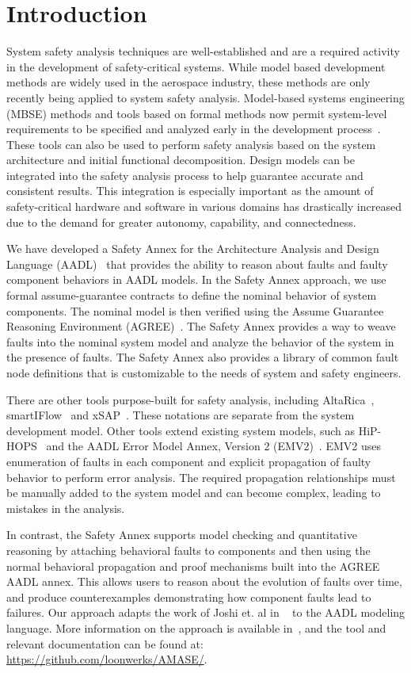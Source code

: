 \section{Introduction}
\label{sec:intro}
System safety analysis techniques are well-established and are a required activity in the development of safety-critical systems. While model based development methods are widely used in the aerospace industry, these methods are only recently being applied to system safety analysis. Model-based systems engineering (MBSE) methods and tools based on formal methods now permit system-level requirements to be specified and analyzed early in the development process~\cite{NFM2012:CoGaMiWhLaLu,CAV2015:BoCiGrMa}. These tools can also be used to perform safety analysis based on the system architecture and initial functional decomposition. Design models can be integrated into the safety analysis process to help guarantee accurate and consistent results. This integration is especially important as the amount of safety-critical hardware and software in various domains has drastically increased due to the demand for greater autonomy, capability, and connectedness.

We have developed a Safety Annex for the Architecture Analysis and Design Language (AADL)~\cite{FeilerModelBasedEngineering2012} that provides the ability to reason about faults and faulty component behaviors in AADL models. In the Safety Annex approach, we use formal assume-guarantee contracts to define the nominal behavior of system components. The nominal model is then verified using the Assume Guarantee Reasoning Environment (AGREE)~\cite{NFM2012:CoGaMiWhLaLu}. The Safety Annex  provides a way to weave faults into the nominal system model and analyze the behavior of the system in the presence of faults. The Safety Annex also provides a library of common fault node definitions that is customizable to the needs of system and safety engineers.

There are other tools purpose-built for safety analysis, including AltaRica~\cite{PROSVIRNOVA2013127}, smartIFlow~\cite{info8010007} and xSAP~\cite{DBLP:conf/tacas/BittnerBCCGGMMZ16}. These notations are separate from the system development model. Other tools extend existing system models, such as HiP-HOPS~\cite{CHEN201391} and the AADL Error Model Annex, Version 2 (EMV2)~\cite{EMV2}. EMV2 uses enumeration of faults in each component and explicit propagation of faulty behavior to perform error analysis. The required propagation relationships must be manually added to the system model and can become complex, leading to mistakes in the analysis.

In contrast, the Safety Annex supports model checking and quantitative reasoning by attaching behavioral faults to components and then using the normal behavioral propagation and proof mechanisms built into the AGREE AADL annex.  This allows users to reason about the evolution of faults over time, and produce counterexamples demonstrating how component faults lead to failures.
Our approach adapts the work of Joshi et. al in
~\cite{Joshi05:Dasc} to the AADL modeling language.  More information on the approach is available in~\cite{Stewart17:IMBSA}, and the tool and relevant documentation can be found at: \small \url{https://github.com/loonwerks/AMASE/}. \normalsize 